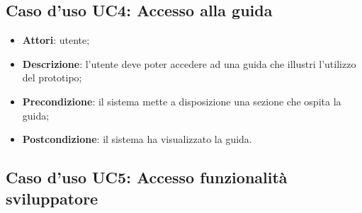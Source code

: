 \documentclass[../AnalisiDeiRequisiti.tex]{subfiles}
\begin{document}
\subsection{Caso d'uso UC4: Accesso alla guida}
\begin{itemize}
\item \textbf{Attori}: utente;
\item \textbf{Descrizione}: l'utente deve poter accedere ad una guida che illustri l'utilizzo del prototipo; 
      \item \textbf{Precondizione}: il sistema mette a disposizione una sezione che ospita la guida;
    \item \textbf{Postcondizione}: il sistema ha visualizzato la guida.
  \end{itemize}
  \newpage
\hypertarget{UC5}{}
\subsection{Caso d'uso UC5: Accesso funzionalità sviluppatore}
\end{document}
